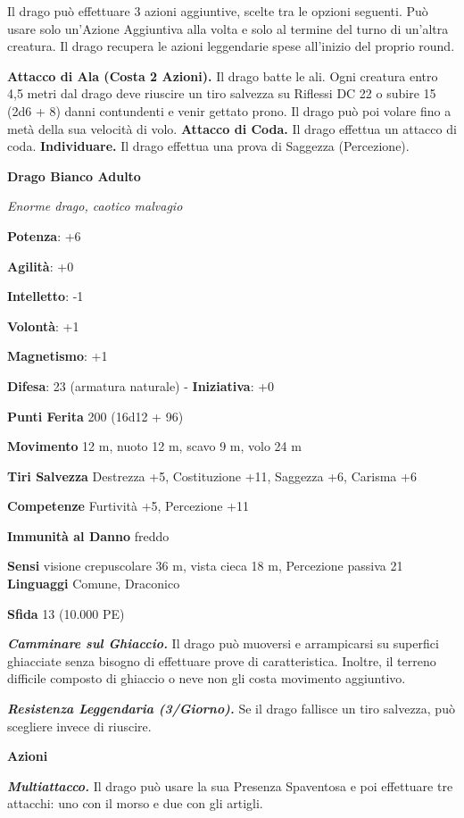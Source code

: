 \begin{multicols}{2}
Il drago può effettuare 3 azioni aggiuntive, scelte tra le opzioni
seguenti. Può usare solo un'Azione Aggiuntiva alla volta e solo al
termine del turno di un'altra creatura. Il drago recupera le azioni
leggendarie spese all'inizio del proprio round.

\textbf{Attacco di Ala (Costa 2 Azioni).} Il drago batte le ali. Ogni
creatura entro 4,5 metri dal drago deve riuscire un tiro salvezza su Riflessi DC 22 o subire 15 (2d6 + 8) danni contundenti e venir gettato
prono. Il drago può poi volare fino a metà della sua velocità di volo.
\textbf{Attacco di Coda.} Il drago effettua un attacco di coda.
\textbf{Individuare.} Il drago effettua una prova di Saggezza
(Percezione).

\textbf{Drago Bianco Adulto}

\emph{Enorme drago, caotico malvagio}

\textbf{Potenza}: +6

\textbf{Agilità}: +0

\textbf{Intelletto}: -1

\textbf{Volontà}: +1

\textbf{Magnetismo}: +1

\textbf{Difesa}: 23 (armatura naturale) - \textbf{Iniziativa}: +0

\textbf{Punti Ferita} 200 (16d12 + 96)

\textbf{Movimento} 12 m, nuoto 12 m, scavo 9 m, volo 24 m

\textbf{Tiri Salvezza} Destrezza +5, Costituzione +11, Saggezza +6,
Carisma +6

\textbf{Competenze} Furtività +5, Percezione +11

\textbf{Immunità al Danno} freddo

\textbf{Sensi} visione crepuscolare 36 m, vista cieca 18 m, Percezione passiva
21 \textbf{Linguaggi} Comune, Draconico

\textbf{Sfida} 13 (10.000 PE)\smallskip

\emph{\textbf{Camminare sul Ghiaccio.}} Il drago può muoversi e
arrampicarsi su superfici ghiacciate senza bisogno di effettuare prove
di caratteristica. Inoltre, il terreno difficile composto di ghiaccio o
neve non gli costa movimento aggiuntivo.

\emph{\textbf{Resistenza Leggendaria (3/Giorno).}} Se il drago fallisce
un tiro salvezza, può scegliere invece di riuscire.

\smallskip\textbf{Azioni}

\emph{\textbf{Multiattacco.}} Il drago può usare la sua Presenza
Spaventosa e poi effettuare tre attacchi: uno con il morso e due con gli
artigli.


\end{multicols}
